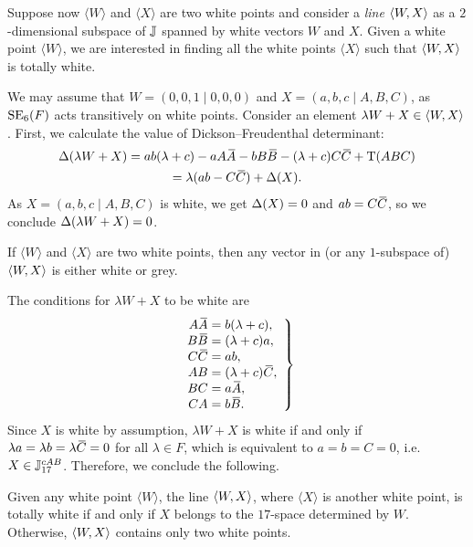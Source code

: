 
Suppose now $\langle W \rangle$ and 
$\langle X \rangle$ are two white points and consider a \textit{line} $\langle W, X \rangle$ as 
a $2$-dimensional subspace of $\mathbb{J}$ spanned by white vectors $W$ and $X$. 
Given a white point $\langle W \rangle$, we are interested in finding all
the white points $\langle X \rangle$ such that $\langle W, X \rangle$ is totally white. 

We may assume that 
\mbox{$W = (0,0,1\mid 0,0,0)$} and $X = (a,b,c\mid A,B,C)$, as $\mathrm{SE}_6(F)$ acts transitively on white points. 
Consider an element $\lambda W + X \in \langle W, X \rangle$. First, we calculate the 
value of Dickson--Freudenthal determinant:
\begin{multline}
	\fdet( \lambda W + X ) = ab(\lambda + c) - a A \ovA - b B \ovB - (\lambda + c) C \ovC
		+ \Tr(ABC) \\
		= \lambda( ab - C\ovC ) + \fdet(X).
\end{multline}
As $X = (a,b,c\mid A,B,C)$ is white, we get $\Delta(X) = 0$ and $ab = C\mathord{\mbox{\hspace*{0pt}}\,\overline{\!C\!\!\;}\!\:}\mbox{\hspace*{0pt}}$, so
we conclude $\Delta( \lambda W + X) = 0$.

\begin{proposition}
	\label{prop:lines}
	If $\langle W \rangle$ and $\langle X \rangle$ are two white points, then any vector in
	(or any $1$-subspace of) $\langle W, X \rangle$ is either white or grey.
\end{proposition}

The conditions for $\lambda W + X$ to be white are
\begin{equation}
	\left.
		\begin{array}{r@{\;}c@{\;}l}
			A\ovA & = & b (\lambda + c), \\
			B\ovB & = & (\lambda + c) a, \\
			C\ovC & = & ab, \\
			AB & = & (\lambda + c) \ovC, \\
			BC & = & a\ovA, \\
			CA & = & b\ovB. 
		\end{array}
	\right\}
\end{equation}
Since $X$ is white by assumption, $\lambda W + X$ is white if and only if
$\lambda a = \lambda b = \lambda \mathord{\mbox{\hspace*{0pt}}\,\overline{\!C\!\!\;}\!\:}\mbox{\hspace*{0pt}} = 0$ for all $\lambda \in F$, which is equivalent to
$a = b = C = 0$, i.e. $X \in \mathbb{J}_{17}^{cAB}$. Therefore, we conclude the following.

\begin{proposition}
	\label{prop:white_lines}
	Given any white point $\langle W \rangle$, the line $\langle W, X \rangle$, where $\langle X \rangle$
	is another white point, is totally white if and only if $X$ belongs to the $17$-space 
	determined by $W$. Otherwise, $\langle W, X \rangle$ contains only two white points. 
\end{proposition}

